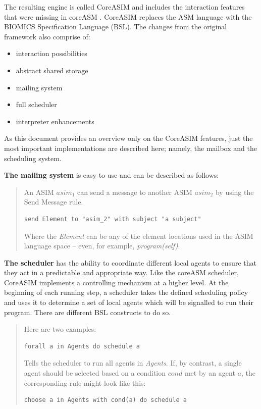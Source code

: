 The resulting engine is called CoreASIM and includes the interaction features that were missing in coreASM \cite{BIOMICSD42}\cite{BIOMICSD52}. CoreASIM replaces the ASM language with the BIOMICS Specification Language (BSL). The changes from the original framework also comprise of:

\begin{itemize}
	\item interaction possibilities
	\item abstract shared storage
	\item mailing system
	\item full scheduler
	\item interpreter enhancements
\end{itemize}

As this document provides an overview only on the CoreASIM features, just the most important implementations are described here; namely, the mailbox and the scheduling system.

\textbf{The mailing system} is easy to use and can be described as follows:
\begin{quote}
\small
An ASIM $asim_1$ can send a message to another ASIM $asim_2$ by using the Send Message rule.\nopagebreak
\begin{lstlisting}[language=bsl]
	send Element to "asim_2" with subject "a subject"
\end{lstlisting}
Where the \textit{Element} can be any of the element locations used in the ASIM language space -- even, for example, \textit{program(self)}.
\end{quote}

\textbf{The scheduler} has the ability to coordinate different local agents to ensure that they act in a predictable and appropriate way. Like the coreASM scheduler, CoreASIM implements a controlling mechanism at a higher level. At the beginning of each running step, a scheduler takes the defined scheduling policy and uses it to determine a set of local agents which will be signalled to run their program. There are different BSL constructs to do so.
\begin{quote}
Here are two examples:
\begin{lstlisting}[language=bsl]
	forall a in Agents do schedule a
\end{lstlisting}
Tells the scheduler to run all agents in \textit{Agents}. If, by contrast, a single agent should be selected based on a condition $cond$ met by an agent $a$, the corresponding rule might look like this:
\begin{lstlisting}[language=bsl]
	choose a in Agents with cond(a) do schedule a
\end{lstlisting}
\end{quote}

